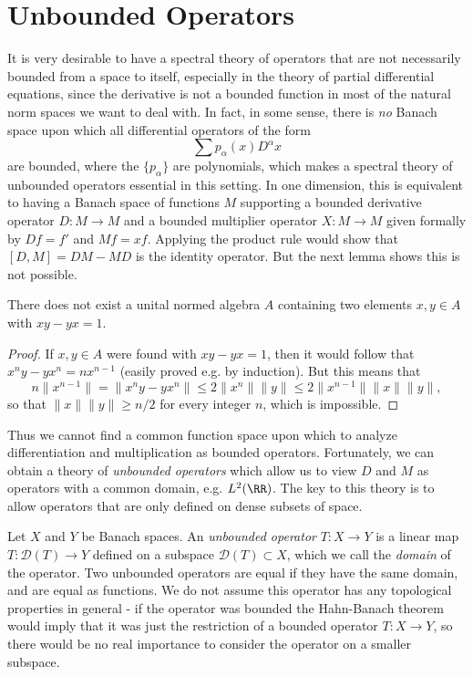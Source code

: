 \chapter{Unbounded Operators}

It is very desirable to have a spectral theory of operators that are not necessarily bounded from a space to itself, especially in the theory of partial differential equations, since the derivative is not a bounded function in most of the natural norm spaces we want to deal with. In fact, in some sense, there is \emph{no} Banach space upon which all differential operators of the form
%
\[ \sum p_\alpha(x) D^\alpha x \]
%
are bounded, where the $\{ p_\alpha \}$ are polynomials, which makes a spectral theory of unbounded operators essential in this setting. In one dimension, this is equivalent to having a Banach space of functions $M$ supporting a bounded derivative operator $D: M \to M$ and a bounded multiplier operator $X: M \to M$ given formally by $Df = f'$ and $Mf = xf$. Applying the product rule would show that $[D,M] = DM - MD$ is the identity operator. But the next lemma shows this is not possible.

\begin{lemma}
    There does not exist a unital normed algebra $A$ containing two elements $x,y \in A$ with $xy - yx = 1$.
\end{lemma}
\begin{proof}
    If $x,y \in A$ were found with $xy - yx = 1$, then it would follow that $x^n y - yx^n = nx^{n-1}$ (easily proved e.g. by induction). But this means that
    \[ n \| x^{n-1} \| = \| x^n y - yx^n \| \leq 2 \| x^n \| \| y \| \leq 2 \| x^{n-1} \| \| x \| \| y \|, \]
    so that $\| x \| \| y \| \geq n/2$ for every integer $n$, which is impossible.
\end{proof}

Thus we cannot find a common function space upon which to analyze differentiation and multiplication as bounded operators. Fortunately, we can obtain a theory of \emph{unbounded operators} which allow us to view $D$ and $M$ as operators with a common domain, e.g. $L^2(\RR)$. The key to this theory is to allow operators that are only defined on dense subsets of space.

Let $X$ and $Y$ be Banach spaces. An \emph{unbounded operator} $T: X \to Y$ is a linear map $T: \mathcal{D}(T) \to Y$ defined on a subspace $\mathcal{D}(T) \subset X$, which we call the \emph{domain} of the operator. Two unbounded operators are equal if they have the same domain, and are equal as functions. We do not assume this operator has any topological properties in general - if the operator was bounded the Hahn-Banach theorem would imply that it was just the restriction of a bounded operator $T: X \to Y$, so there would be no real importance to consider the operator on a smaller subspace.

